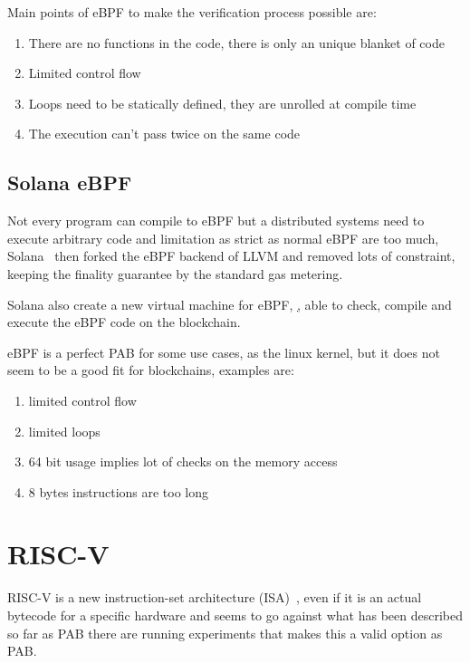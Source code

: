 Main points of eBPF to make the verification process possible are:
\begin{enumerate}
  \item There are no functions in the code, there is only an unique blanket of code
  \item Limited control flow
  \item Loops need to be statically defined, they are unrolled at compile time
  \item The execution can't pass twice on the same code
\end{enumerate}

\subsection{Solana eBPF}

Not every program can compile to eBPF but a distributed systems need to execute arbitrary code and limitation as strict as normal eBPF are too much, Solana~\cite{yakovenko2018solana} then forked the eBPF backend of LLVM and removed lots of constraint, keeping the finality guarantee by the standard gas metering.~\cite{ebpf-contracts}

Solana also create a new virtual machine for eBPF, \href{https://github.com/qmonnet/rbpf}, able to check, compile and execute the eBPF code on the blockchain.

eBPF is a perfect PAB for some use cases, as the linux kernel, but it does not seem to be a good fit for blockchains, examples are:
\begin{enumerate}
  \item limited control flow
  \item limited loops
  \item 64 bit usage implies lot of checks on the memory access
  \item 8 bytes instructions are too long
\end{enumerate}

\section{RISC-V}

RISC-V is a new instruction-set architecture (ISA)~\cite{risc-v-spec}, even if it is an actual bytecode for a specific hardware and seems to go against what has been described so far as PAB there are running experiments that makes this a valid option as PAB.

